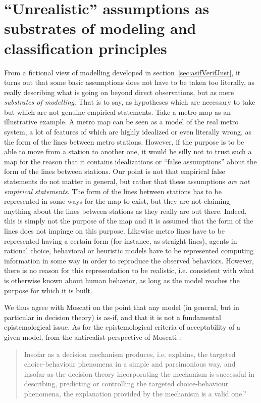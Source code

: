 \documentclass[a4paper,11pt]{article}
\theoremstyle{definition}
\begin{document}
\section{``Unrealistic'' assumptions as substrates of modeling and classification principles}
\label{sec:epistemo_criterion}
From a fictional view of modelling developed in section~\ref{sec:asifVerifJust}, it turns out that some basic assumptions does not have to be taken too literally, as really describing what is going on beyond direct observations, but as mere \textit{substrates of modelling}. That is to say, as hypotheses which are necessary to take but which are not genuine empirical statements. Take a metro map as an illustrative example. A metro map can be seen as a model of the real metro system, a lot of features of which are highly idealized or even literally wrong, as the form of the lines between metro stations. However, if the purpose is to be able to move from a station to another one, it would be silly not to trust such a map for the reason that it contains idealizations or ``false assumptions'' about the form of the lines between stations. Our point is not that empirical false statements do not matter in general, but rather that these assumptions \textit{are not empirical statements}. The form of the lines between stations has to be represented in some ways for the map to exist, but they are not claiming anything about the lines between stations as they really are out there. Indeed, this is simply not the purpose of the map and it is assumed that the form of the lines does not impinge on this purpose. Likewise metro lines have to be represented having a certain form (for instance, as straight lines), agents in rational choice, behavioral or heuristic models have to be represented computing information in some way in order to reproduce the observed behaviors. However, there is no reason for this representation to be realistic, i.e. consistent with what is otherwise known about human behavior, as long as the model reaches the purpose for which it is built. 

We thus agree with Moscati on the point that any model (in general, but in particular in decision theory) is as-if, and that it is not a fundamental epistemological issue. As for the epistemological criteria of acceptability of a given model, from the antirealist perspective of Moscati  \citep[p.~22]{Moscati2023}: 

\begin{quote}
Insofar as a decision mechanism produces, i.e. explains, the targeted choice-behaviour phenomena in a simple and parcimonious way, and insofar as the decision theory incorporating the mechanism is successful \textelp{} in describing, predicting or controlling the targeted choice-behaviour phenomena, the explanation provided by the mechanism is a valid one.'' 
\end{quote}
\end{document}
